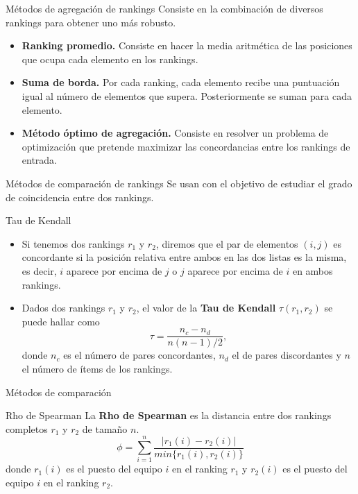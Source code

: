 \documentclass{beamer}
\begin{document}
	\begin{frame}{Métodos de agregación de rankings}
		Consiste en la combinación de diversos rankings para obtener uno más robusto.
		\begin{itemize}
			\item \textbf{Ranking promedio.} Consiste en hacer la media aritmética de las posiciones que ocupa cada elemento en los rankings.
			\item \textbf{Suma de borda.} Por cada ranking, cada elemento recibe una puntuación igual al número de elementos que supera. Posteriormente se suman para cada elemento.
			\item \textbf{Método óptimo de agregación.} Consiste en resolver un problema de optimización que pretende maximizar las concordancias entre los rankings de entrada.
		\end{itemize}
	\end{frame}
	
	\begin{frame}{Métodos de comparación de rankings}
		Se usan con el objetivo de estudiar el grado de coincidencia entre dos rankings.
		\begin{block}{Tau de Kendall}
			\begin{itemize}
				\item Si tenemos dos rankings $r_{1}$ y $r_{2}$, diremos que el par de elementos $(i,j)$ es concordante si la posición relativa entre ambos en las dos listas es la misma, es decir, $i$ aparece por encima de $j$ o $j$ aparece por encima de $i$ en ambos rankings.
				\item Dados dos rankings $r_{1}$ y $r_{2}$, el valor de la \textbf{Tau de Kendall} $\tau(r_{1},r_{2})$ se puede hallar como
				\begin{equation*}
				\tau = \dfrac{n_{c} - n_{d}}{n(n-1)/2},
				\end{equation*}
				donde $n_{c}$ es el número de pares concordantes, $n_{d}$ el de pares discordantes y $n$ el número de ítems de los rankings.  
			\end{itemize}
		\end{block}
	\end{frame}	

	\begin{frame}{Métodos de comparación}
		\begin{block}{Rho de Spearman}
			La \textbf{Rho de Spearman} es la distancia entre dos rankings completos $r_{1}$ y $r_{2}$ de tamaño $n$. 
			\begin{equation} 
			\phi = \sum_{i=1}^{n} \dfrac{|r_{1}(i) - r_{2}(i)|}{min\{r_{1}(i),r_{2}(i)\}}
			\end{equation}
			donde $r_{1}(i)$ es el puesto del equipo $i$ en el ranking $r_{1}$ y $r_{2}(i)$ es el puesto del equipo $i$ en el ranking $r_{2}$.	
		\end{block}		
	\end{frame}	
\end{document}
